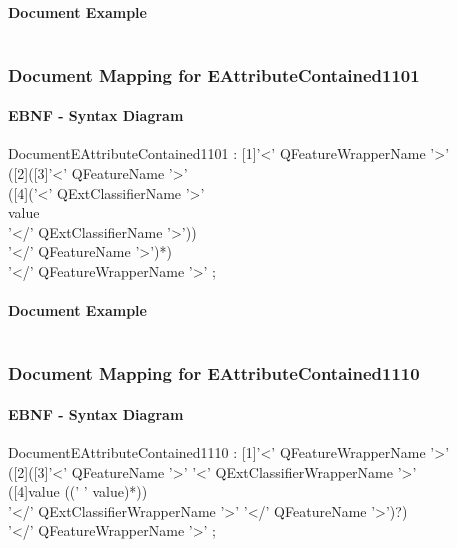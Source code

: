 \documentclass[11pt,a4paper]{article}
\begin{document}
\paragraph{Document Example}
\inputminted[fontsize=\footnotesize]{xml}{examples/EAttributeContained1100.xml}

\subsubsection{Document Mapping for EAttributeContained1101}
\paragraph{EBNF - Syntax Diagram}
\begin{rail}
DocumentEAttributeContained1101 : [1]'<' QFeatureWrapperName '>' \\
([2]([3]'<' QFeatureName '>' \\
([4]('<' QExtClassifierName '>' \\
value\\
'</' QExtClassifierName '>')) \\
'</' QFeatureName '>')*) \\
'</' QFeatureWrapperName '>' ;
\end{rail}
\paragraph{Document Example}
\inputminted[fontsize=\footnotesize]{xml}{examples/EAttributeContained1101.xml}


\subsubsection{Document Mapping for EAttributeContained1110}
\paragraph{EBNF - Syntax Diagram}
\begin{rail}
DocumentEAttributeContained1110 : [1]'<' QFeatureWrapperName '>' \\
([2]([3]'<' QFeatureName '>' '<' QExtClassifierWrapperName '>' \\
([4]value ((' ' value)*)) \\
'</' QExtClassifierWrapperName '>' '</' QFeatureName '>')?) \\
'</' QFeatureWrapperName '>' ;
\end{rail}
\end{document}
